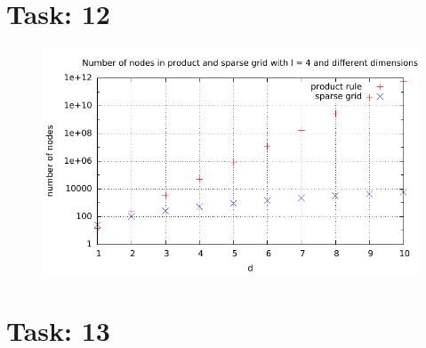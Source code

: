 \documentclass{article}
\begin{document}
\section*{Task: 12}

\begin{figure}[htbp]
  \centering
     \includegraphics[width=1.0\textwidth]{../Task12/sh3_task12_num_of_nodes.pdf}
\end{figure}

\section*{Task: 13}
\end{document}
